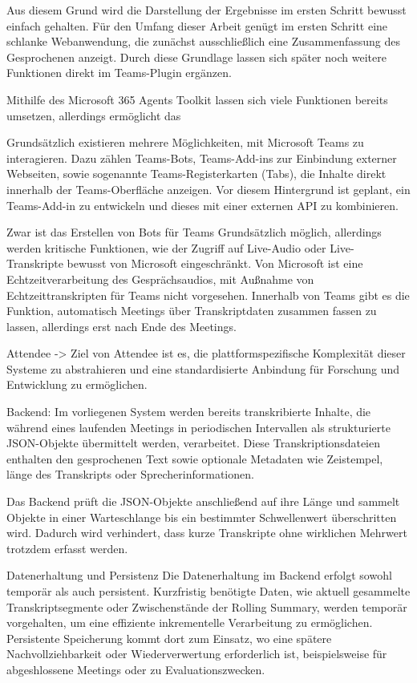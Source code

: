 Aus diesem Grund wird die Darstellung der Ergebnisse im ersten Schritt bewusst einfach gehalten. Für den Umfang dieser Arbeit genügt im ersten Schritt eine schlanke Webanwendung, die zunächst ausschließlich eine Zusammenfassung des Gesprochenen anzeigt. Durch diese Grundlage lassen sich später noch weitere Funktionen direkt im Teams-Plugin ergänzen. 

Mithilfe des Microsoft 365 Agents Toolkit lassen sich viele Funktionen bereits umsetzen, allerdings ermöglicht das 

Grundsätzlich existieren mehrere Möglichkeiten, mit Microsoft Teams zu interagieren. Dazu zählen Teams-Bots, Teams-Add-ins zur Einbindung externer Webseiten, sowie sogenannte Teams-Registerkarten (Tabs), die Inhalte direkt innerhalb der Teams-Oberfläche anzeigen. Vor diesem Hintergrund ist geplant, ein Teams-Add-in zu entwickeln und dieses mit einer externen API zu kombinieren. 

Zwar ist das Erstellen von Bots für Teams Grundsätzlich möglich, allerdings werden kritische Funktionen, wie der Zugriff auf Live-Audio oder Live-Transkripte bewusst von Microsoft eingeschränkt. Von Microsoft ist eine Echtzeitverarbeitung des Gesprächsaudios, mit Außnahme von Echtzeittranskripten für Teams nicht vorgesehen. Innerhalb von Teams gibt es die Funktion, automatisch Meetings über Transkriptdaten zusammen fassen zu lassen, allerdings erst nach Ende des Meetings. 

Attendee -> Ziel von Attendee ist es, die plattformspezifische Komplexität dieser Systeme zu abstrahieren und eine standardisierte Anbindung für Forschung und Entwicklung zu ermöglichen.

Backend:
Im vorliegenen System werden bereits transkribierte Inhalte, die während eines laufenden Meetings in periodischen Intervallen als strukturierte JSON-Objekte übermittelt werden, verarbeitet. Diese Transkriptionsdateien enthalten den gesprochenen Text sowie optionale Metadaten wie Zeistempel, länge des Transkripts oder Sprecherinformationen. 

Das Backend prüft die JSON-Objekte anschließend auf ihre Länge und sammelt Objekte in einer Warteschlange bis ein bestimmter Schwellenwert überschritten wird. Dadurch wird verhindert, dass kurze Transkripte ohne wirklichen Mehrwert trotzdem erfasst werden.

Datenerhaltung und Persistenz 
Die Datenerhaltung im Backend erfolgt sowohl temporär als auch persistent. Kurzfristig benötigte Daten, wie aktuell gesammelte Transkriptsegmente oder Zwischenstände der Rolling Summary, werden temporär vorgehalten, um eine effiziente inkrementelle Verarbeitung zu ermöglichen. Persistente Speicherung kommt dort zum Einsatz, wo eine spätere Nachvollziehbarkeit oder Wiederverwertung erforderlich ist, beispielsweise für abgeshlossene Meetings oder zu Evaluationszwecken.

